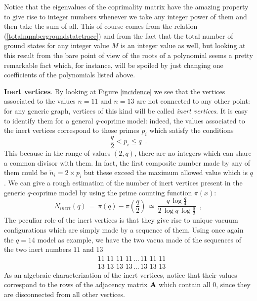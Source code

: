 \documentclass[aps,pra,superscriptaddress]{revtex4}
\newcommand\be            {\begin{equation}}
\newcommand\ee            {\end{equation}}
\renewcommand{\(}{\left(}
\renewcommand{\)}{\right)}
\renewcommand{\[}{\left[}
\renewcommand{\]}{\right]}
\begin{document}
Notice that the eigenvalues of the coprimality matrix have the amazing property to give rise to integer numbers whenever we take any integer power of them and then take the sum of all. This of course comes from the relation (\ref{totalnumbergroundstatetrace}) and from the fact that the total number of ground states for any integer value $M$ is an integer value as well, but looking at this result from the bare point of view of the roots of a polynomial seems a pretty remarkable fact which, for instance, will be spoiled by just changing one coefficients of the polynomials listed above. 



\vspace{3mm}
\noindent
{\bf Inert vertices}. By looking at Figure \ref{incidence} we see that the vertices associated to the values $n = 11$ and $n=13$ are not connected to any other point: for any generic graph, vertices of this kind will be called {\em inert vertices}. It is easy to identify them for a general $q$-coprime model:  indeed, the values associated to the inert vertices correspond to those primes $p_i$ which satisfy the conditions 
\be 
\frac{q}{2} < p_i \leq q \,\,\,.
\ee
This because in the range of values $(2,q)$, there are no integers which can share a common divisor with them. In fact, the first composite number made by 
any of them could be $\tilde n_i = 2 \times p_i$ but these exceed the maximum allowed value which is $q$. We can give a rough estimation of the number of inert vertices present in the generic $q$-coprime model by using the prime counting function $\pi(x)$: 
\be 
N_{inert}(q) \,=\, \pi(q) - \pi\left(\frac{q}{2}\right) \,\simeq \, \frac{q \,\log\frac{q}{4}}{2\,\log q\,\log\frac{q}{2}} 
\,\,\,, 
\ee  
The peculiar role of the inert vertices is that they give rise to unique vacuum configurations which are simply made by a sequence of them. 
Using once again the $q=14$ model as example, we have the two vacua made of the sequences of the two inert numbers $11$ and $13$  
\begin{eqnarray}
&& 11 \,\, 11\,\, 11\,\, 11\, \ldots\,  11\,\,11 \,\, 11\,\,\,\,  \\
&& 13 \,\, 13\,\, 13\,\, 13\, \ldots \, 13\,\,13 \,\, 13\,\,\,\,
\end{eqnarray}
As an algebraic characterization of the inert vertices, notice that their values correspond to the rows of the adjacency matrix ${\bf A}$  which 
contain all $0$, since they are disconnected from all other vertices.  
\end{document}
